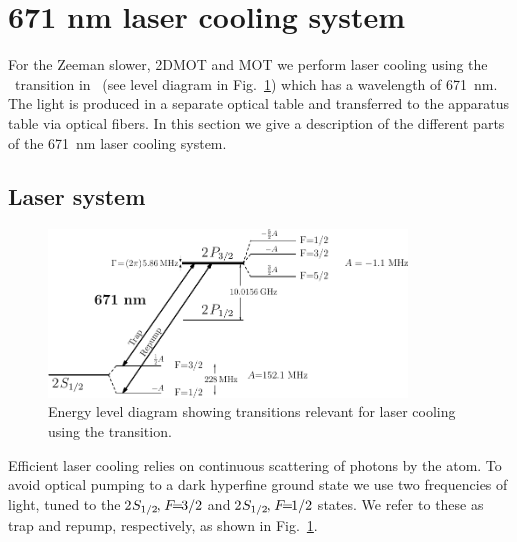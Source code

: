 \section{671 nm laser cooling system}


For the Zeeman slower, 2DMOT and MOT we perform laser cooling using the \red\
transition in \li\ (see level diagram in Fig.~\ref{fig:671levels}) which has a
wavelength of 671~nm.    The light is produced in a separate optical table and
transferred to the apparatus table via optical fibers.  In this section we give
a description of the different parts of the 671~nm laser cooling system.  



\subsection{Laser system}

\begin{figure} \centering
\includegraphics[width=0.85\textwidth]{../masters-figures/levels/671-levels/lithium.pdf}
\caption[Lithium-6 energy level diagram]{\small Energy level diagram showing
transitions relevant for laser cooling \li using the \red transition. }
\label{fig:671levels} \end{figure} 

Efficient laser cooling relies on continuous scattering of photons by the atom.
To avoid optical pumping to a dark hyperfine ground state we use two
frequencies of light, tuned to the $\twos{1/2}\cm\f{3/2}$ and
$\twos{1/2}\cm\f{1/2}$ states.  We refer to these as trap and repump,
respectively, as shown in Fig.~\ref{fig:671levels}. 

